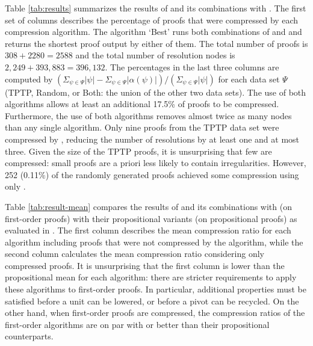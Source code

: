 Table \ref{tab:results} summarizes the results of {\FORPI} and its combinations with {\GFOLU}. The first set of columns describes the percentage of proofs that were compressed by each compression algorithm. The algorithm `Best' runs both combinations of {\GFOLU} and {\FORPI} and returns the shortest proof output by either of them. The total number of proofs is $308+2280=2588$ and the total number of resolution nodes is $2,249 + 393,883
= 396,132$. The percentages in the last three columns are computed by $(\Sigma_{\psi \in \Psi} |\psi|  - \Sigma_{\psi\in \Psi} |\alpha(\psi)|)/(\Sigma_{\psi \in \Psi} |\psi|)$ for each data set $\Psi$ (TPTP, Random, or Both: the union of the other two data sets). 
The use of both algorithms allows at least an additional 17.5\% of proofs to be compressed. Furthermore, the use of both algorithms removes almost twice as many nodes than any single algorithm.
Only nine proofs from the TPTP data set were compressed by {\FORPI}, reducing the number of resolutions by at least one and at most three. Given the size of the TPTP proofs, it is unsurprising that few are compressed: small proofs are a priori less likely to contain irregularities. However, 252 (0.11\%) of the randomly generated proofs achieved some compression using only {\FORPI}. 

Table \ref{tab:result-mean} compares the results of {\FORPI} and its combinations with {\GFOLU} (on first-order proofs) with their propositional variants (on propositional proofs) as evaluated in \cite{Boudou}. The first column describes the mean compression ratio for each algorithm including proofs that were not compressed by the algorithm, while the second column calculates the mean compression ratio considering only compressed proofs. It is unsurprising that the first column is lower than the propositional mean for each algorithm: there are stricter requirements to apply these algorithms to first-order proofs. In particular, additional properties must be satisfied before a unit can be lowered, or before a pivot can be recycled. On the other hand, when first-order proofs are compressed, the compression ratios of the first-order algorithms are on par with or better than their propositional counterparts.

